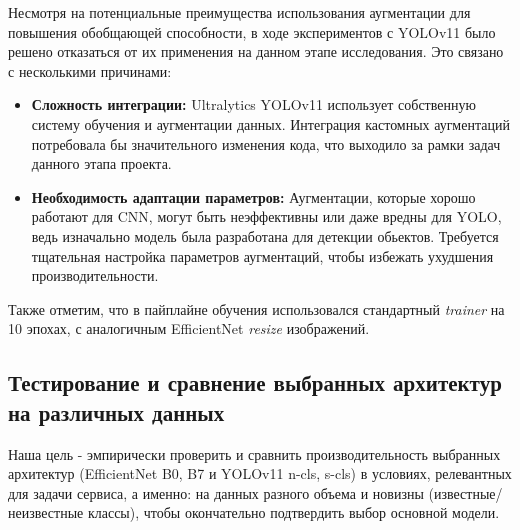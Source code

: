 \documentclass[14pt]{extarticle}
\begin{document}
Несмотря на потенциальные преимущества использования аугментации для повышения обобщающей способности, в ходе экспериментов с YOLOv11 было решено отказаться от их применения на данном этапе исследования. Это связано с несколькими причинами:


\begin{itemize}
    \item \textbf{Сложность интеграции:} Ultralytics YOLOv11 использует собственную систему обучения и аугментации данных. Интеграция кастомных аугментаций потребовала бы значительного изменения кода, что выходило за рамки задач данного этапа проекта.
    \item \textbf{Необходимость адаптации параметров:} Аугментации, которые хорошо работают для CNN, могут быть неэффективны или даже вредны для YOLO, ведь изначально модель была разработана для детекции обьектов. Требуется тщательная настройка параметров аугментаций, чтобы избежать ухудшения производительности.
\end{itemize}

Также отметим, что в пайплайне обучения использовался стандартный \textit{trainer} на 10 эпохах, с аналогичным EfficientNet \textit{resize} изображений.

\subsection{Тестирование и сравнение выбранных архитектур на различных данных}
Наша цель - эмпирически проверить и сравнить производительность выбранных архитектур (EfficientNet B0, B7 и YOLOv11 n-cls, s-cls) в условиях, релевантных для задачи сервиса, а именно: на данных разного объема и новизны (известные/неизвестные классы), чтобы окончательно подтвердить выбор основной модели.
\vspace{5pt}
\end{document}
